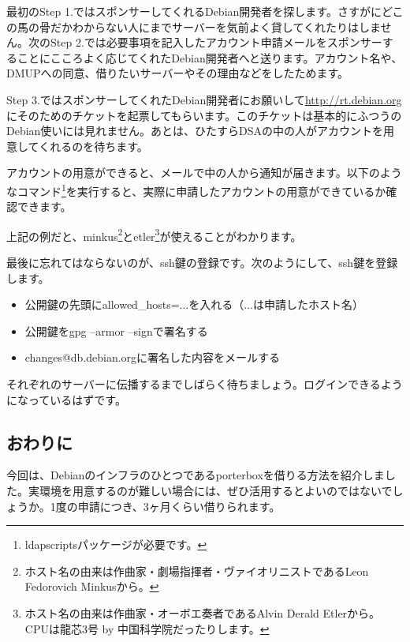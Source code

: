\documentclass[mingoth,a4paper]{jsarticle}
\begin{document}
最初のStep 1.ではスポンサーしてくれるDebian開発者を探します。さすがにどこの馬の骨だかわからない人にまでサーバーを気前よく貸してくれたりはしません。次のStep 2.では必要事項を記入したアカウント申請メールをスポンサーすることにこころよく応じてくれたDebian開発者へと送ります。アカウント名や、DMUPへの同意、借りたいサーバーやその理由などをしたためます。

Step 3.ではスポンサーしてくれたDebian開発者にお願いして\url{http://rt.debian.org}にそのためのチケットを起票してもらいます。このチケットは基本的にふつうのDebian使いには見れません。あとは、ひたすらDSAの中の人がアカウントを用意してくれるのを待ちます。

アカウントの用意ができると、メールで中の人から通知が届きます。以下のようなコマンド\footnote{ldapscriptsパッケージが必要です。}を実行すると、実際に申請したアカウントの用意ができているか確認できます。


上記の例だと、minkus\footnote{ホスト名の由来は作曲家・劇場指揮者・ヴァイオリニストであるLeon Fedorovich Minkusから。}とetler\footnote{ホスト名の由来は作曲家・オーボエ奏者であるAlvin Derald Etlerから。CPUは龍芯3号 by 中国科学院だったりします。}が使えることがわかります。

最後に忘れてはならないのが、ssh鍵の登録です。次のようにして、ssh鍵を登録します。

\begin{itemize}
\item 公開鍵の先頭にallowed\_hosts=...を入れる（...は申請したホスト名）
\item 公開鍵をgpg --armor --signで署名する
\item changes@db.debian.orgに署名した内容をメールする
\end{itemize}

それぞれのサーバーに伝播するまでしばらく待ちましょう。ログインできるようになっているはずです。

\subsection{おわりに}

今回は、Debianのインフラのひとつであるporterboxを借りる方法を紹介しました。実環境を用意するのが難しい場合には、ぜひ活用するとよいのではないでしょうか。1度の申請につき、3ヶ月くらい借りられます。
\end{document}
